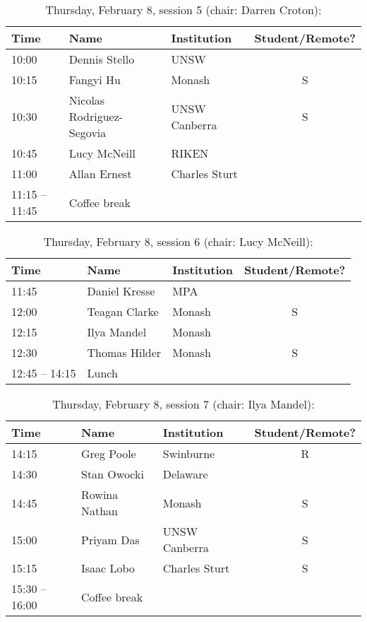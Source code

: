 \documentclass[amsmath,onecolumn]{revtex4-1}
\begin{document}
\begin{table}[!htbp]
	\centering
	\caption{Thursday, February 8, session 5 (chair: Darren Croton):}
\begin{tabular}{| l | l | l | c |}
	\hline
	Time & Name  & Institution & Student/Remote?\\ 		
	\hline
	10:00 & Dennis	Stello & UNSW & \\
	10:15 & Fangyi	Hu & Monash & S \\
	10:30 & Nicolas 	Rodriguez-Segovia  & UNSW Canberra & S\\
	10:45 & Lucy	McNeill & RIKEN & \\
	11:00 & 	Allan	Ernest  & Charles Sturt &  \\
	\hline
	11:15 -- 11:45 & Coffee break & & \\
	\hline
\end{tabular}
\end{table}

\begin{table}[!htbp]
	\centering
	\caption{Thursday, February 8, session 6 (chair:  Lucy	McNeill):}
\begin{tabular}{| l | l | l | c |}
	\hline
	Time & Name  & Institution & Student/Remote? \\ 		
	\hline
	11:45 & Daniel	Kresse & MPA & \\
	12:00 & Teagan	 Clarke & Monash & S\\
	12:15 & Ilya	Mandel & Monash & \\	
	12:30 & Thomas	Hilder & Monash & S\\
	\hline
	12:45 -- 14:15 & Lunch & & \\
	\hline
\end{tabular}
\end{table}

\begin{table}[!htbp]
	\centering
	\caption{Thursday, February 8, session 7 (chair: Ilya Mandel):}
\begin{tabular}{| l | l | l | c |}
	\hline
	Time & Name  & Institution & Student/Remote? \\ 		
	\hline
	14:15& Greg Poole & Swinburne & R \\
	14:30 & Stan	Owocki & Delaware & \\
	14:45 & Rowina	Nathan & Monash & S\\
	15:00 & Priyam	Das  & UNSW Canberra & S \\	
	15:15 &  Isaac	Lobo&  Charles Sturt & S \\
	\hline
	15:30 -- 16:00 & Coffee break & & \\
	\hline
\end{tabular}
\end{table}
	
\end{document}

